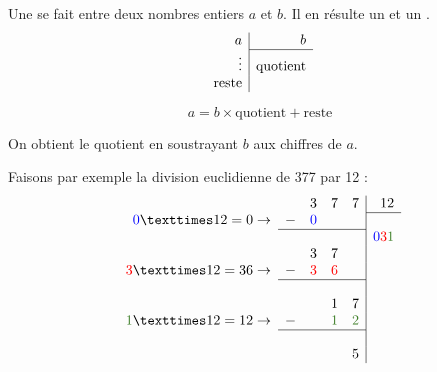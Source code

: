 \documentclass[../€Cours-complet/Cours-complet]{subfiles}
\begin{document}
\begin{cours}
	Une  se fait entre deux nombres entiers $a$ et $b$. Il en résulte un  et un .
	$$
		\begin{array}{r|r}
			a            & b               \\
			\cline{2-2}
			\vdots       & \text{quotient} \\
			\text{reste} &
		\end{array}
	$$

	$$ a = b × \text{quotient} + \text{reste} $$

	On obtient le quotient en soustrayant $b$ aux chiffres de $a$.
\end{cours}

\begin{exemple}
	Faisons par exemple la division euclidienne de 377 par 12 :
	$$
		\begin{array}{rrrrr|r}
			                                        &   & 3                   & 7                         & 7                         & 12                                                             \\
			\cline{6-6}
			\textcolor{blue}{0} × 12 = 0 \to        & - & \textcolor{blue}{0} &                           &                           &                                                                \\
			\cline{2-5}
			                                        &   &                     &                           &                           & \textcolor{blue}{0}\textcolor{red}{3}\textcolor{OliveGreen}{1} \\
			                                        &   & 3                   & 7                         &                           &                                                                \\
			\textcolor{red}{3} × 12 = 36 \to        & - & \textcolor{red}{3}  & \textcolor{red}{6}        &                           &                                                                \\
			\cline{2-5}
			                                        &   &                     &                           &                           &                                                                \\
			                                        &   &                     & 1                         & 7                         &                                                                \\
			\textcolor{OliveGreen}{1} × 12 = 12 \to & - &                     & \textcolor{OliveGreen}{1} & \textcolor{OliveGreen}{2} &                                                                \\
			\cline{2-5}
			                                        &   &                     &                           &                           &                                                                \\
			                                        &   &                     &                           & 5                         &
		\end{array}
	$$


\end{exemple}
\end{document}
